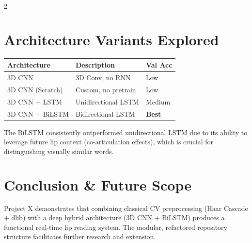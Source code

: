 \documentclass[10pt, a4paper]{article}
\begin{document}
\begin{multicols}{2}
\section{Architecture Variants Explored}

\begin{center}
\scriptsize
\begin{tabular}{@{}p{2.5cm} p{3cm} p{1.5cm}@{}}
\toprule
\textbf{Architecture} & \textbf{Description} & \textbf{Val Acc} \\
\midrule
3D CNN              & 3D Conv, no RNN       & Low \\
3D CNN (Scratch)    & Custom, no pretrain   & Low \\
3D CNN + LSTM       & Unidirectional LSTM   & Medium \\
3D CNN + BiLSTM     & Bidirectional LSTM    & \textbf{Best} \\
\bottomrule
\end{tabular}
\end{center}

The BiLSTM consistently outperformed unidirectional LSTM due to its
ability to leverage future lip context (co-articulation effects),
which is crucial for distinguishing visually similar words.

\section{Conclusion \& Future Scope}

Project X demonstrates that combining classical CV preprocessing
(Haar Cascade + dlib) with a deep hybrid architecture (3D CNN + BiLSTM)
produces a functional real-time lip reading system. The modular, refactored
repository structure facilitates further research and extension.


\end{multicols}
\end{document}
